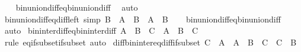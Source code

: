 \begin{isabellebody}
%
\isadelimproof
\ \ %
\endisadelimproof
%
\isatagproof
{}\isamarkupfalse%
\ bin{\isacharunderscore}{\kern0pt}union{\isacharunderscore}{\kern0pt}diff{\isacharunderscore}{\kern0pt}eq{\isacharunderscore}{\kern0pt}bin{\isacharunderscore}{\kern0pt}union{\isacharunderscore}{\kern0pt}diff\ \isamarkupfalse%
\ auto%
\endisatagproof
{\isafoldproof}%
%
\isadelimproof
\isanewline
%
\endisadelimproof
\isanewline
{}\isamarkupfalse%
\ bin{\isacharunderscore}{\kern0pt}union{\isacharunderscore}{\kern0pt}diff{\isacharunderscore}{\kern0pt}eq{\isacharunderscore}{\kern0pt}diff{\isacharunderscore}{\kern0pt}left\ {\isacharbrackleft}{\kern0pt}simp{\isacharbrackright}{\kern0pt}{\isacharcolon}{\kern0pt}\ {\isachardoublequoteopen}{\isacharparenleft}{\kern0pt}B\ {\isasymunion}\ A{\isacharparenright}{\kern0pt}\ {\isasymsetminus}\ B\ {\isacharequal}{\kern0pt}\ A\ {\isasymsetminus}\ B{\isachardoublequoteclose}\isanewline
%
\isadelimproof
\ \ %
\endisadelimproof
%
\isatagproof
{}\isamarkupfalse%
\ bin{\isacharunderscore}{\kern0pt}union{\isacharunderscore}{\kern0pt}diff{\isacharunderscore}{\kern0pt}eq{\isacharunderscore}{\kern0pt}bin{\isacharunderscore}{\kern0pt}union{\isacharunderscore}{\kern0pt}diff\ \isamarkupfalse%
\ auto%
\endisatagproof
{\isafoldproof}%
%
\isadelimproof
\isanewline
%
\endisadelimproof
\isanewline
{}\isamarkupfalse%
\ bin{\isacharunderscore}{\kern0pt}inter{\isacharunderscore}{\kern0pt}diff{\isacharunderscore}{\kern0pt}eq{\isacharunderscore}{\kern0pt}bin{\isacharunderscore}{\kern0pt}inter{\isacharunderscore}{\kern0pt}diff{\isacharcolon}{\kern0pt}\ {\isachardoublequoteopen}{\isacharparenleft}{\kern0pt}A\ {\isasyminter}\ B{\isacharparenright}{\kern0pt}\ {\isasymsetminus}\ C\ {\isacharequal}{\kern0pt}\ A\ {\isasyminter}\ {\isacharparenleft}{\kern0pt}B\ {\isasymsetminus}\ C{\isacharparenright}{\kern0pt}{\isachardoublequoteclose}\isanewline
%
\isadelimproof
\ \ %
\endisadelimproof
%
\isatagproof
{}\isamarkupfalse%
\ {\isacharparenleft}{\kern0pt}rule\ eq{\isacharunderscore}{\kern0pt}if{\isacharunderscore}{\kern0pt}subset{\isacharunderscore}{\kern0pt}if{\isacharunderscore}{\kern0pt}subset{\isacharparenright}{\kern0pt}\ auto%
\endisatagproof
{\isafoldproof}%
%
\isadelimproof
\isanewline
%
\endisadelimproof
\isanewline
{}\isamarkupfalse%
\ diff{\isacharunderscore}{\kern0pt}bin{\isacharunderscore}{\kern0pt}inter{\isacharunderscore}{\kern0pt}eq{\isacharunderscore}{\kern0pt}diff{\isacharunderscore}{\kern0pt}if{\isacharunderscore}{\kern0pt}subset{\isacharcolon}{\kern0pt}\ {\isachardoublequoteopen}C\ {\isasymsubseteq}\ A\ {\isasymLongrightarrow}\ {\isacharparenleft}{\kern0pt}{\isacharparenleft}{\kern0pt}A\ {\isasymsetminus}\ B{\isacharparenright}{\kern0pt}\ {\isasyminter}\ C{\isacharparenright}{\kern0pt}\ {\isacharequal}{\kern0pt}\ {\isacharparenleft}{\kern0pt}C\ {\isasymsetminus}\ B{\isacharparenright}{\kern0pt}{\isachardoublequoteclose}\isanewline

\end{isabellebody}
